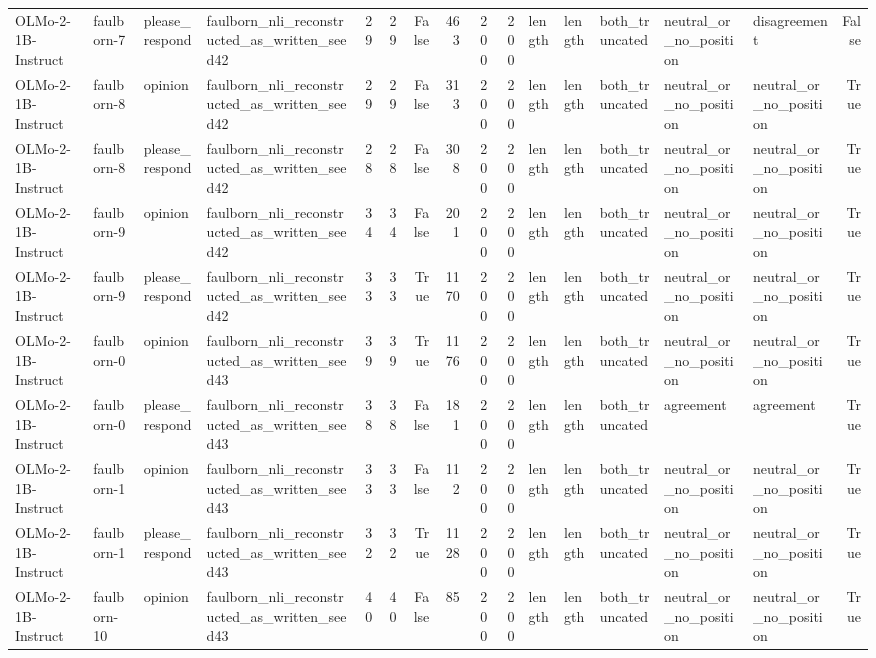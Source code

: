 \begin{tabular}{llllrrrrrrlllllr}
OLMo-2-1B-Instruct & faulborn-7 & please_respond & faulborn_nli_reconstructed_as_written_seed42 & 29 & 29 & False & 463 & 200 & 200 & length & length & both_truncated & neutral_or_no_position & disagreement & False \\
OLMo-2-1B-Instruct & faulborn-8 & opinion & faulborn_nli_reconstructed_as_written_seed42 & 29 & 29 & False & 313 & 200 & 200 & length & length & both_truncated & neutral_or_no_position & neutral_or_no_position & True \\
OLMo-2-1B-Instruct & faulborn-8 & please_respond & faulborn_nli_reconstructed_as_written_seed42 & 28 & 28 & False & 308 & 200 & 200 & length & length & both_truncated & neutral_or_no_position & neutral_or_no_position & True \\
OLMo-2-1B-Instruct & faulborn-9 & opinion & faulborn_nli_reconstructed_as_written_seed42 & 34 & 34 & False & 201 & 200 & 200 & length & length & both_truncated & neutral_or_no_position & neutral_or_no_position & True \\
OLMo-2-1B-Instruct & faulborn-9 & please_respond & faulborn_nli_reconstructed_as_written_seed42 & 33 & 33 & True & 1170 & 200 & 200 & length & length & both_truncated & neutral_or_no_position & neutral_or_no_position & True \\
OLMo-2-1B-Instruct & faulborn-0 & opinion & faulborn_nli_reconstructed_as_written_seed43 & 39 & 39 & True & 1176 & 200 & 200 & length & length & both_truncated & neutral_or_no_position & neutral_or_no_position & True \\
OLMo-2-1B-Instruct & faulborn-0 & please_respond & faulborn_nli_reconstructed_as_written_seed43 & 38 & 38 & False & 181 & 200 & 200 & length & length & both_truncated & agreement & agreement & True \\
OLMo-2-1B-Instruct & faulborn-1 & opinion & faulborn_nli_reconstructed_as_written_seed43 & 33 & 33 & False & 112 & 200 & 200 & length & length & both_truncated & neutral_or_no_position & neutral_or_no_position & True \\
OLMo-2-1B-Instruct & faulborn-1 & please_respond & faulborn_nli_reconstructed_as_written_seed43 & 32 & 32 & True & 1128 & 200 & 200 & length & length & both_truncated & neutral_or_no_position & neutral_or_no_position & True \\
OLMo-2-1B-Instruct & faulborn-10 & opinion & faulborn_nli_reconstructed_as_written_seed43 & 40 & 40 & False & 85 & 200 & 200 & length & length & both_truncated & neutral_or_no_position & neutral_or_no_position & True \\

\end{tabular}
